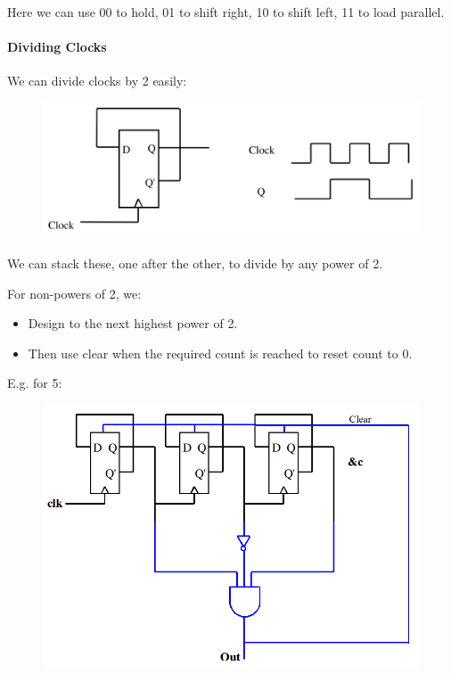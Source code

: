\documentclass[twocolumn,english]{article}
\begin{document}
Here we can use 00 to hold, 01 to shift right, 10 to shift left, 11
to load parallel.


\paragraph{Dividing Clocks}

We can divide clocks by 2 easily:

\begin{figure}[H]
\noindent \centering{}\includegraphics[width=0.25\paperwidth]{img/clockdiv2}
\end{figure}


We can stack these, one after the other, to divide by any power of
2.

For non-powers of 2, we:
\begin{itemize}
\item Design to the next highest power of 2.
\item Then use clear when the required count is reached to reset count to
0.
\end{itemize}
E.g. for 5:

\begin{figure}[H]
\noindent \centering{}\includegraphics[width=0.225\paperwidth]{img/clockdiv5}
\end{figure}
\end{document}
